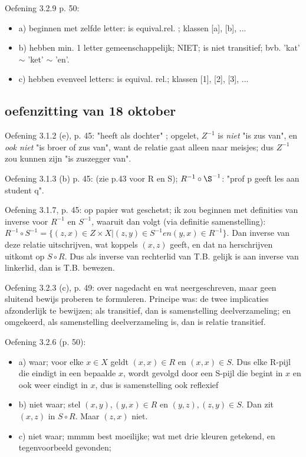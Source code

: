 \documentclass{article}
\begin{document}
Oefening 3.2.9 p. 50: 
\begin{itemize}
    \item a) beginnen met zelfde letter: is equival.rel. ; klassen [a], [b], ...
    \item b) hebben min. 1 letter gemeenschappelijk; NIET; is niet transitief; bvb. 'kat' $\sim$ 'ket' $\sim$ 'en'. 
    \item c) hebben evenveel letters: is equival. rel.; klassen [1], [2], [3], ... 
\end{itemize}

\subsection*{oefenzitting van 18 oktober} 

Oefening 3.1.2 (e), p. 45: "heeft als dochter" ; opgelet, $Z^{-1}$ is \emph{niet} "is zus van", en \emph{ook niet} "is broer of zus van", want de relatie gaat alleen naar meisjes; dus $Z^{-1}$ zou kunnen zijn "is zuszegger van". 

Oefening 3.1.3 (b) p. 45: (zie p.43 voor R en S); $R^{-1} \circ \S^{-1}$: "prof p geeft les aan student q". 

Oefening 3.1.7, p. 45: op papier wat geschetst; ik zou beginnen met definities van inverse voor $R^{-1}$ en  $S^{-1}$, waaruit dan volgt (via definitie samenstelling): $R^{-1} \circ S^{-1} = \{(z,x) \in Z \times X | (z,y) \in S^{-1} en (y,x) \in R^{-1}   \}$. Dan inverse van deze relatie uitschrijven, wat koppels $(x,z)$ geeft, en dat na herschrijven uitkomt op $S \circ R$. Dus als inverse van rechterlid van T.B. gelijk is aan inverse van linkerlid, dan is T.B. bewezen. 

Oefening 3.2.3 (c), p. 49: over nagedacht en wat neergeschreven, maar geen sluitend bewijs proberen te formuleren. Principe was: de twee implicaties afzonderlijk te bewijzen; als transitief, dan is samenstelling deelverzameling; en omgekeerd, als samenstelling deelverzameling is, dan is relatie transitief. 

Oefening 3.2.6 (p. 50):  
\begin{itemize}
    \item a) waar; voor elke $x \in X$ geldt $(x,x) \in R $ en $(x,x) \in S $. Dus elke R-pijl die eindigt in een bepaalde $x$, wordt gevolgd door een S-pijl die begint in $x$ en ook weer eindigt in $x$, dus is samenstelling ook reflexief
    \item b) niet waar; stel $(x,y), (y,x) \in R$ en $(y,z),(z,y) \in S$. Dan zit $(x,z)$ in $S \circ R$. Maar $(z,x)$ niet.
    \item c) niet waar; mmmm best moeilijke; wat met drie kleuren getekend, en tegenvoorbeeld gevonden; 
\end{itemize}
\end{document}

